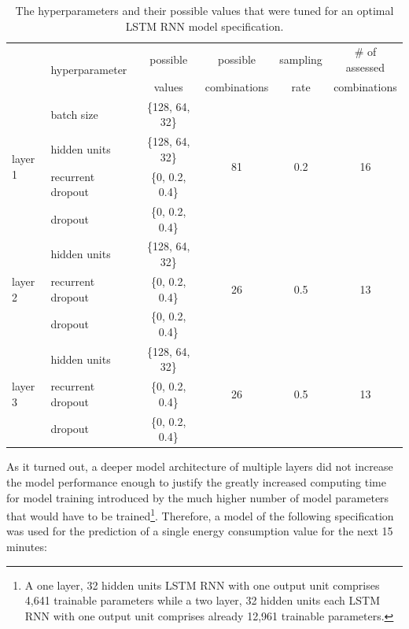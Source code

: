 \begin{table}[htbp]
    \begin{center}
        {\footnotesize
        \begin{tabular}{l|lcccc}
        \hline \hline
        & \multirow{2}{3em}{hyperparameter} & possible & possible     & sampling & \# of assessed \\
        &                                   & values   & combinations & rate     & combinations   \\
        \hline
                \multirow{4}{3em}{layer 1}  & batch size        & \{128, 64, 32\} & \multirow{4}{1em}{81} & \multirow{4}{1em}{0.2} & \multirow{4}{1em}{16} \\
                                            & hidden units      & \{128, 64, 32\} & & &\\
                                            & recurrent dropout & \{0, 0.2, 0.4\} & & & \\
                                            & dropout           & \{0, 0.2, 0.4\} & & & \\[0.2cm]
                                            & hidden units      & \{128, 64, 32\} & & & \\
                layer 2                     & recurrent dropout & \{0, 0.2, 0.4\} & 26 & 0.5 & 13 \\
                                            & dropout           & \{0, 0.2, 0.4\} & \\[0.2cm]
                                            & hidden units      & \{128, 64, 32\} & \\
                layer 3                     & recurrent dropout & \{0, 0.2, 0.4\} & 26 & 0.5 & 13 \\
                                            & dropout           & \{0, 0.2, 0.4\} & \\
            \hline \hline
        \end{tabular}}
    \end{center}
    \caption[Hyperparameters tuned for optimal LSTM RNN model specification]{The hyperparameters and their possible values that were tuned for an optimal LSTM RNN model specification.}
    \label{Tab:LSTMHyperparameters}
\end{table}

As it turned out, a deeper model architecture of multiple layers did not increase the model performance enough to justify the greatly increased computing time for model training introduced by the much higher number of model parameters that would have to be trained\footnote{A one layer, 32 hidden units LSTM RNN with one output unit comprises 4,641 trainable parameters while a two layer, 32 hidden units each LSTM RNN with one output unit comprises already 12,961 trainable parameters.}. Therefore, a model of the following specification was used for the prediction of a single energy consumption value for the next 15 minutes:

